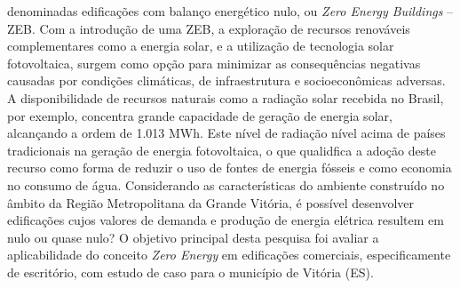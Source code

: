 \begin{onehalfspace}
    denominadas edificações com balanço energético nulo, 
    ou \textit{Zero Energy Buildings} – ZEB.
    Com a introdução de uma ZEB, a exploração de recursos renováveis complementares 
    como a energia solar, e a utilização de tecnologia solar fotovoltaica, surgem como 
    opção para minimizar as consequências negativas causadas por condições climáticas, 
    de infraestrutura e socioeconômicas adversas.\vspace*{0.3cm} \newline
    \noindent A disponibilidade de recursos naturais como a radiação solar recebida 
    no Brasil, por exemplo, concentra grande capacidade de geração de energia solar,
    alcançando a ordem de 1.013 MWh. Este nível de radiação nível acima de países 
    tradicionais na geração de energia fotovoltaica, o que qualidfica a adoção deste 
    recurso como forma de reduzir o uso de fontes de energia fósseis e como economia 
    no consumo de água.\vspace*{0.3cm} \newline
    \noindent Considerando as características do ambiente construído no âmbito da 
    Região Metropolitana da Grande Vitória, é possível desenvolver edificações cujos 
    valores de demanda e produção de energia elétrica resultem em nulo ou quase nulo? 
    O objetivo principal desta pesquisa foi avaliar a aplicabilidade do conceito 
    \textit{Zero Energy} em edificações comerciais, especificamente de escritório, 
    com estudo de caso para o município de Vitória (ES).
\end{onehalfspace}
